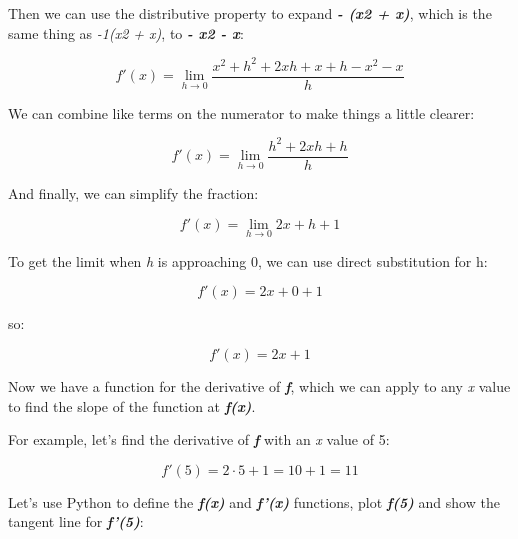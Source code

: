 \documentclass[11pt]{article}
\begin{document}
Then we can use the distributive property to expand \textbf{\emph{- (x2
+ x)}}, which is the same thing as \emph{-1(x2 + x)}, to \textbf{\emph{-
x2 - x}}:

\begin{equation}f'(x) = \lim_{h \to 0} \frac{x^{2} + h^{2} + 2xh + x + h - x^{2} - x}{h} \end{equation}

We can combine like terms on the numerator to make things a little
clearer:

\begin{equation}f'(x) = \lim_{h \to 0} \frac{h^{2} + 2xh + h}{h} \end{equation}

And finally, we can simplify the fraction:

\begin{equation}f'(x) = \lim_{h \to 0} 2x + h + 1 \end{equation}

To get the limit when \emph{h} is approaching 0, we can use direct
substitution for h:

\begin{equation}f'(x) = 2x + 0 + 1 \end{equation}

so:

\begin{equation}f'(x) = 2x + 1 \end{equation}

Now we have a function for the derivative of \textbf{\emph{f}}, which we
can apply to any \emph{x} value to find the slope of the function at
\textbf{\emph{f(x)}}.

For example, let's find the derivative of \textbf{\emph{f}} with an
\emph{x} value of 5:

\begin{equation}f'(5) = 2\cdot5 + 1 = 10 + 1 = 11\end{equation}

Let's use Python to define the \textbf{\emph{f(x)}} and
\textbf{\emph{f'(x)}} functions, plot \textbf{\emph{f(5)}} and show the
tangent line for \textbf{\emph{f'(5)}}:
\end{document}
